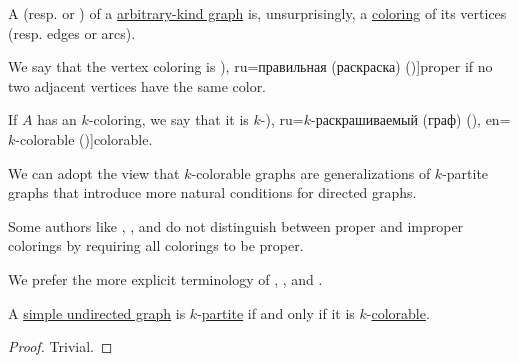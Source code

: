 \begin{definition}\label{def:graph_coloring}
  A  (resp.  or ) of a \hyperref[rem:arbitrary_kind_graph]{arbitrary-kind graph} is, unsurprisingly, a \hyperref[def:set_coloring]{coloring} of its vertices (resp. edges or arcs).

  \begin{thmenum}
     We say that the vertex coloring is \term[bg=правилно (оцветяване) (\cite[141]{Мирчев2001}), ru=правильная (раскраска) (\cite[\S 53]{Емеличев1990})]{proper} if no two adjacent vertices have the same color.

     If \( A \) has an \( k \)-coloring, we say that it is \( k \)-\term[bg=\( k \)-оцветим (граф) (\cite[141]{Мирчев2001}), ru=\( k \)-раскрашиваемый (граф) (\cite[\S 53]{Емеличев1990}), en=\( k \)-colorable (\cite[111]{Diestel2005})]{colorable}.
  \end{thmenum}
\end{definition}
\begin{comments}
  \item We can adopt the view that \( k \)-colorable graphs are generalizations of \( k \)-partite graphs that introduce more natural conditions for directed graphs.

  \item Some authors like , ,  and  do not distinguish between proper and improper colorings by requiring all colorings to be proper.

  We prefer the more explicit terminology of , ,  and .
\end{comments}

\begin{proposition}\label{thm:n_colorable_iff_multipartite}
  A \hyperref[def:undirected_graph]{simple undirected graph} is \( k \)-\hyperref[def:multipartite_graph]{partite} if and only if it is \( k \)-\hyperref[def:graph_coloring/colorable]{colorable}.
\end{proposition}
\begin{proof}
  Trivial.
\end{proof}

